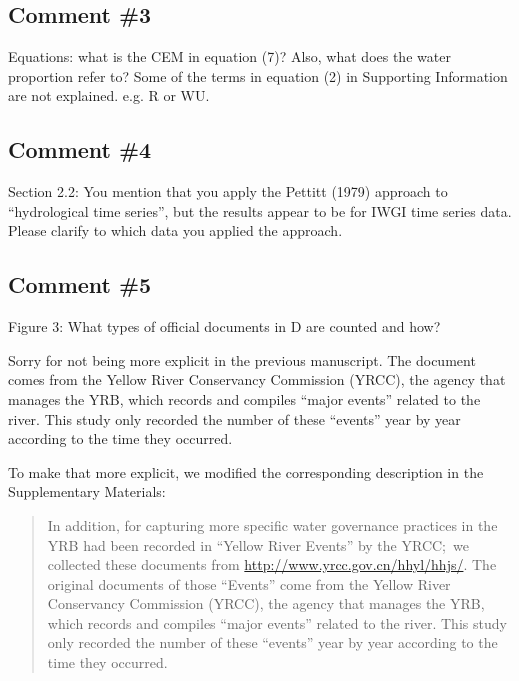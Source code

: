 \subsection{Comment \#3}
\RC{} Equations: what is the CEM in equation (7)? Also, what does the water proportion refer to? Some of the terms in equation (2) in Supporting Information are not explained. e.g. R or WU.　

\subsection{Comment \#4}
\RC{} Section 2.2: You mention that you apply the Pettitt (1979) approach to ``hydrological time series'', but the results appear to be for IWGI time series data. Please clarify to which data you applied the approach.

\subsection{Comment \#5}
\RC{} Figure 3: What types of official documents in D are counted and how?

\AR{} Sorry for not being more explicit in the previous manuscript. The document comes from the Yellow River Conservancy Commission (YRCC), the agency that manages the YRB, which records and compiles ``major events'' related to the river. This study only recorded the number of these ``events'' year by year according to the time they occurred.

\AR*{} To make that more explicit, we modified the corresponding description in the Supplementary Materials:

\begin{quote}
    In addition, for capturing more specific water governance practices in the YRB had been recorded in ``Yellow River Events'' by the YRCC;\ we collected these documents from \url{http://www.yrcc.gov.cn/hhyl/hhjs/}.
    The original documents of those ``Events'' come from the Yellow River Conservancy Commission (YRCC), the agency that manages the YRB, which records and compiles ``major events'' related to the river. This study only recorded the number of these ``events'' year by year according to the time they occurred.
\end{quote}


